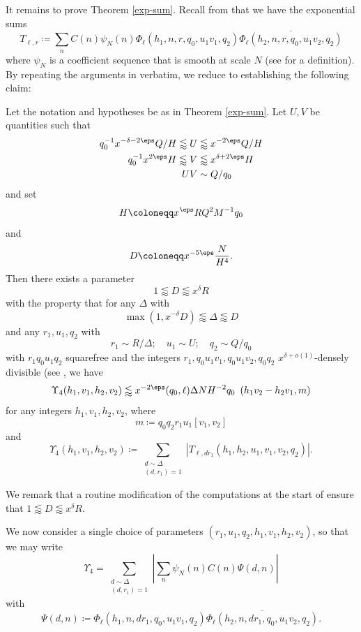 It remains to prove Theorem \ref{exp-sum}.  Recall from \cite[(7.41)]{polymath8a} that we have the exponential sums
$$ T_{\ell,r} \coloneqq \sum_n C(n) \psi_N(n) \Phi_\ell(h_1,n,r,q_0,u_1v_1,q_2) \overline{\Phi_\ell(h_2,n,r,q_0,u_1v_2,q_2)}$$
where $\psi_N$ is a coefficient sequence that is smooth at scale $N$ (see \cite[Definition 2.20]{polymath8a} for a definition).  By repeating the arguments in \cite[\S 10.1]{polymath8a} verbatim, we reduce to establishing the following claim:

\begin{theorem}  Let the notation and hypotheses be as in Theorem \ref{exp-sum}.  Let $U, V$ be quantities such that
\begin{align*}
q_0^{-1} x^{-\delta-2\eps} Q/H \lessapprox U &\lessapprox x^{-2\eps} Q/H \\
q_0^{-1} x^{2\eps} H \lessapprox V &\lessapprox x^{\delta+2\eps} H \\
UV &\sim Q/q_0
\end{align*}
and set
$$ H \coloneqq x^\eps RQ^2 M^{-1} q_0$$
and
$$ D \coloneqq x^{-5\eps} \frac{N}{H^4}.$$
Then there exists a parameter
$$ 1 \lessapprox D \lessapprox x^\delta R$$
with the property that for any $\Delta$ with
$$ \max(1,x^{-\delta} D) \lessapprox \Delta \lessapprox D$$
and any $r_1,u_1,q_2$ with
$$ r_1 \sim R/\Delta; \quad u_1 \sim U; \quad q_2 \sim Q/q_0$$
with $r_1 q_0 u_1 q_2$ squarefree and the integers $r_1, q_0u_1 v_1, q_0 u_1 v_2, q_0 q_2$ $x^{\delta+o(1)}$-densely divisible (see \cite[Definition 2.14]{polymath8a}, we have
\begin{equation}\label{tl-dr}
\Upsilon_4(h_1,v_1,h_2,v_2) \lessapprox 
x^{-2\eps} (q_0,\ell) \Delta
N H^{-2}q_0 \ \left(h_1v_2-h_2v_1,m\right)
\end{equation}
for any integers $h_1,v_1,h_2,v_2$, where
$$ m \coloneqq q_0q_2r_1u_1[v_1,v_2]$$
and
$$ \Upsilon_4(h_1,v_1,h_2,v_2) \coloneqq \sum_{\substack{d\sim \Delta\\(d,r_1)=1}} |T_{\ell,dr_1}(h_1,h_2,u_1,v_1,v_2,q_2)|.$$
\end{theorem}

We remark that a routine modification of the computations at the start of \cite[\S 10.2]{polymath8a} ensure that $1 \lessapprox D \lessapprox x^\delta R$.

We now consider a single choice of parameters $(r_1,u_1,q_2,h_1,v_1,h_2,v_2)$, so that we may write
$$ \Upsilon_4 = \sum_{\substack{d\sim \Delta\\(d,r_1)=1}} |\sum_n \psi_N(n) C(n) \Psi(d,n)| $$
with
$$ \Psi(d,n) \coloneqq \Phi_\ell(h_1,n,dr_1,q_0,u_1v_1,q_2) \overline{\Phi_\ell(h_2,n,dr_1,q_0,u_1v_2,q_2)}.$$

